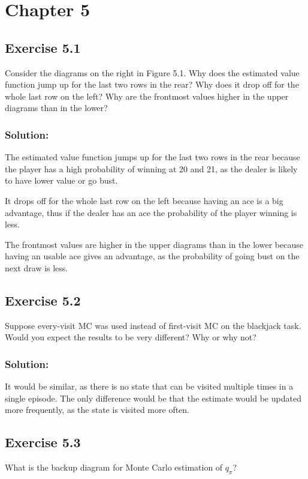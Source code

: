 \section*{Chapter 5}

\subsection*{Exercise 5.1}
Consider the diagrams on the right in Figure 5.1. Why does the estimated
value function jump up for the last two rows in the rear? Why does it drop off for the
whole last row on the left? Why are the frontmost values higher in the upper diagrams
than in the lower?

\subsubsection*{Solution:}

The estimated value function jumps up for the last two rows in the rear because the player has a high probability of winning at 20 and 21, as the dealer is likely to have lower value or go bust.

It drops off for the whole last row on the left because having an ace is a big advantage, thus if the dealer has an ace the probability of the player winning is less.

The frontmost values are higher in the upper diagrams than in the lower because having an usable ace gives an advantage, as the probability of going bust on the next draw is less.

\subsection*{Exercise 5.2}
Suppose every-visit MC was used instead of first-visit MC on the blackjack
task. Would you expect the results to be very different? Why or why not?

\subsubsection*{Solution:}
It would be similar, as there is no state that can be visited multiple times in a single episode. The only difference would be that the estimate would be updated more frequently, as the state is visited more often.

\subsection*{Exercise 5.3}
What is the backup diagram for Monte Carlo estimation of $q_\pi$? 

